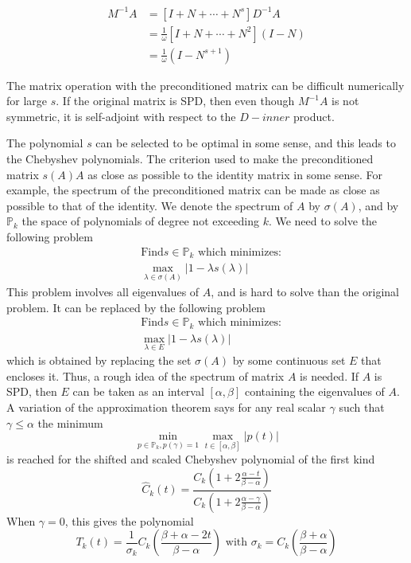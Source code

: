 \begin{align}
    M^{-1}A & = [I + N + \cdots + N^s]D^{-1}A \nonumber \\
    &= \frac{1}{\omega}[I + N + \cdots + N^2](I - N) \nonumber \\
    &= \frac{1}{\omega}(I - N^{s+1})
\end{align}


The matrix operation with the preconditioned matrix can be difficult numerically for large $s$. If the original matrix is SPD, then even though $M^{-1}A$ is not symmetric, it is self-adjoint with respect to the $D-inner$ product.

The polynomial $s$ can be selected to be optimal in some sense, and this leads to the Chebyshev polynomials. The criterion used to make the preconditioned matrix $s(A)A$ as close as possible to the identity matrix in some sense. For example, the spectrum of the preconditioned matrix can be made as close as possible to that of the identity. We denote the spectrum of $A$ by $\sigma(A)$, and by $\mathbb{P}_k$ the space of polynomials of degree not exceeding $k$. We need to solve the following problem
\begin{align}
    &\text{Find} s \in \mathbb{P}_k \text{ which minimizes:} \\
    &\max\limits_{\lambda \in \sigma(A)}|1 - \lambda s(\lambda)| 
\end{align}
This problem involves all eigenvalues of $A$, and is hard to solve than the original problem. It can be replaced by the following problem
\begin{align}
    &\text{Find} s \in \mathbb{P}_k \text{ which minimizes:} \\
    &\max\limits_{\lambda \in E}|1 - \lambda s(\lambda)| 
\end{align}
which is obtained by replacing the set $\sigma(A)$ by some continuous set $E$ that encloses it. Thus, a rough idea of the spectrum of matrix $A$ is needed. If $A$ is SPD, then $E$ can be taken as an interval $[\alpha,\beta]$ containing the eigenvalues of $A$.
A variation of the approximation theorem says for any real scalar $\gamma$ such that $\gamma \leq \alpha$
the minimum
\begin{equation}
    \min\limits_{p \in \mathbb{P}_k,p(\gamma)=1} \max\limits_{t \in [\alpha,\beta]}|p(t)|
\end{equation}
is reached for the shifted and scaled Chebyshev polynomial of the first kind
\begin{equation}
    \hat{C}_k(t) = \frac{C_k(1+2\frac{\alpha - t}{\beta - \alpha})}{C_k (1+2\frac{\alpha - \gamma}{\beta - \alpha})}
\end{equation}
When $\gamma = 0$, this gives the polynomial 
\begin{equation}
    T_k(t) = \frac{1}{\sigma_k}C_k(\frac{\beta + \alpha - 2t}{\beta - \alpha}) \text{ with } \sigma_k = C_k(\frac{\beta+\alpha}{\beta - \alpha})
\end{equation}

